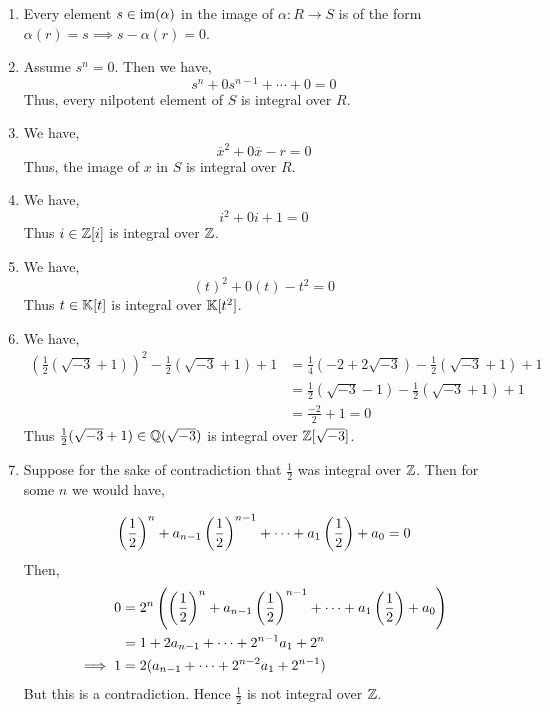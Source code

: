\documentclass[Notebook.tex]{subfiles}
\begin{document}
\begin{solution}
    \bbni
    \begin{enumerate}
        \item Every element $s \in \operatorname{im}(\alpha)$ in the image of $\alpha: R \to S$ is of the form $\alpha(r) = s \implies s - \alpha(r) = 0$. 
        
        \item Assume $s^n = 0$. Then we have, 
        \[s^n + 0 s^{n-1} + \cdots + 0 = 0\]
        Thus, every nilpotent element of $S$ is integral over $R$.

        \item We have, 
        \[\overline{x}^2 + 0 \overline{x} - r = 0\]
        Thus, the image of $x$ in $S$ is integral over $R$.

        \item We have, 
        \[i^2 + 0i + 1 = 0\]
        Thus $i \in \mathbb Z[i]$ is integral over $\mathbb Z$. 

        \item We have, 
        \[(t)^2 + 0(t)  - t^2 = 0\]
        Thus $t \in \mathbb K[t]$ is integral over $\mathbb K[t^2]$.
        
        \item We have, 
        \begin{align*}
            \left(\frac{1}{2}(\sqrt{-3} + 1)\right)^2 - \frac{1}{2}(\sqrt{-3} + 1) + 1 &= \frac{1}{4}\left(-2 + 2 \sqrt{-3}\right) - \frac{1}{2}(\sqrt{-3} + 1)  + 1 \\ 
            &= \frac{1}{2}\left(\sqrt{-3} - 1\right) - \frac{1}{2}(\sqrt{-3} + 1)  + 1 \\ 
            &= \frac{-2}{2} + 1 = 0 
        \end{align*}
        Thus $\frac{1}{2}(\sqrt{-3}+1)\in \mathbb Q(\sqrt{-3})$ is integral over $\mathbb Z[\sqrt{-3}]$.

        \item Suppose for the sake of contradiction that $\frac{1}{2}$ was integral over $\mathbb Z$. Then for some $n$ we would have, 
        
        \[\left(\frac{1}{2}\right)^n + a_{n-1} \left(\frac{1}{2}\right)^{n-1} + \cdots + a_1 \left(\frac{1}{2}\right) + a_0 = 0\]
        Then, 
        \begin{align*}
           0 &= 2^n \left(\left(\frac{1}{2}\right)^n + a_{n-1} \left(\frac{1}{2}\right)^{n-1} + \cdots + a_1 \left(\frac{1}{2}\right) + a_0\right) \\ 
           &= 1 + 2a_{n-1} + \cdots + 2^{n-1}a_1 + 2^n  \\ 
           \implies 1 &= 2 (a_{n-1} + \cdots + 2^{n-2}a_1 + 2^{n-1})
        \end{align*}
        But this is a contradiction. Hence $\frac{1}{2}$ is not integral over $\mathbb Z$. 
    \end{enumerate}
\end{solution}
\end{document}
